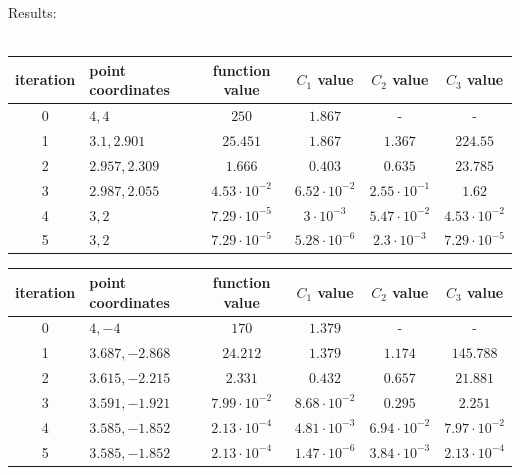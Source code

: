 \documentclass[12pt]{article}
\begin{document}
\begin{table}[H]
	Results: \\ \\
	\begin{tabularx}{\textwidth}{c|X|c|c|c|c|}
		iteration & point coordinates & function value & $C_1$ value & $C_2$ value & $C_3$ value\\
		\hline
		0 & $4, 4$ & $250$ & $1.867$ & - & - \\
		\hline					
		1 & $3.1, 2.901$ & $25.451$ & $1.867$ & $1.367$ & $224.55$ \\
		\hline
		2 & $2.957, 2.309$  & $1.666$ & $0.403$ & $0.635$ & $23.785$ \\ 
		\hline
		3 & $2.987 ,2.055$ & $4.53\cdot10^{-2}$ & $6.52\cdot10^{-2}$ & $2.55\cdot10^{-1}$  & $1.62$ \\
		\hline
		4 & $3, 2$ & $7.29\cdot10^{-5}$ & $3\cdot10^{-3}$ & $5.47\cdot10^{-2}$ & $4.53\cdot10^{-2}$ \\
		\hline
		5 & $3, 2$ & $7.29\cdot10^{-5}$ & $5.28\cdot10^{-6}$ & $2.3\cdot10^{-3}$ & $7.29\cdot10^{-5}$\\
		\hline

	\end{tabularx}	
\end{table}		

\begin{table}[H]
	\begin{tabularx}{\textwidth}{c|X|c|c|c|c|}
		iteration & point coordinates & function value & $C_1$ value & $C_2$ value & $C_3$ value\\
		\hline
		0 & $4, -4$ & $170$ & $1.379$ & - & - \\
		\hline
		1 & $3.687, -2.868$ & $24.212$ & $1.379$ & $1.174$ & $145.788$ \\ 
		\hline
		2 & $3.615, -2.215$ & $2.331$ & $0.432$ & $0.657$ & $21.881$ \\
		\hline
		3 & $3.591, -1.921$ & $7.99\cdot10^{-2}$ & $8.68\cdot10^{-2}$ & $0.295$ & $2.251$ \\
		\hline
		4 & $3.585, -1.852$ & $2.13\cdot10^{-4}$ & $4.81\cdot10^{-3}$ & $6.94\cdot10^{-2}$ & $7.97\cdot10^{-2}$ \\
		\hline
		5 & $3.585, -1.852$ & $2.13\cdot10^{-4}$ & $1.47\cdot10^{-6}$ & $3.84\cdot10^{-3}$ & $2.13\cdot10^{-4}$ \\ 
		\hline
	\end{tabularx}	
\end{table}	
\end{document}
